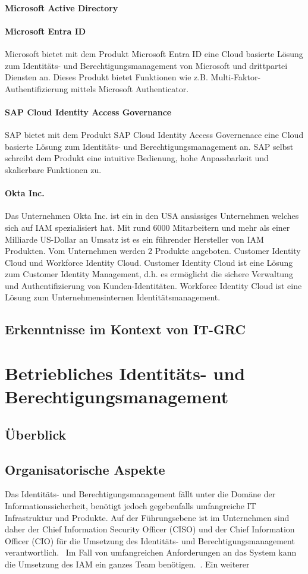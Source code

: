 \documentclass[10pt]{article}
\begin{document}
\paragraph{Microsoft Active Directory}
\paragraph{Microsoft Entra ID}
Microsoft bietet mit dem Produkt \glqq{}Microsoft Entra ID\grqq{} eine Cloud basierte Lösung zum Identitäts- und Berechtigungsmanagement von Microsoft und drittpartei Diensten an. Dieses Produkt bietet Funktionen wie z.B. Multi-Faktor-Authentifizierung mittels Microsoft Authenticator.
\paragraph{SAP Cloud Identity Access Governance}
SAP bietet mit dem Produkt \glqq{}SAP Cloud Identity Access Governenace\grqq{} eine Cloud basierte Lösung zum Identitäts- und Berechtigungsmanagement an. SAP selbst schreibt dem Produkt eine intuitive Bedienung, hohe Anpassbarkeit und skalierbare Funktionen zu.
\paragraph{Okta Inc.}
Das Unternehmen Okta Inc. ist ein in den USA ansässiges Unternehmen welches sich auf IAM spezialisiert hat. Mit rund 6000 Mitarbeitern und mehr als einer Milliarde US-Dollar an Umsatz ist es ein führender Hersteller von IAM Produkten. Vom Unternehmen werden 2 Produkte angeboten. Customer Identity Cloud und Workforce Identity Cloud. Customer Identity Cloud ist eine Lösung zum Customer Identity Management, d.h. es ermöglicht die sichere Verwaltung und Authentifizierung von Kunden-Identitäten. Workforce Identity Cloud ist eine Lösung zum Unternehmensinternen Identitätsmanagement.
\subsection{Erkenntnisse im Kontext von IT-GRC}
\section{Betriebliches Identitäts- und Berechtigungsmanagement}
\label{sec:betrieb}
\subsection{Überblick}
\subsection{Organisatorische Aspekte}
Das Identitäts- und Berechtigungsmanagement fällt unter die Domäne der Informationssicherheit, benötigt jedoch gegebenfalls umfangreiche IT Infrastruktur und Produkte. Auf der Führungsebene ist im Unternehmen sind daher der Chief Information Security Officer (CISO) und der Chief Information Officer (CIO) für die Umsetzung des Identitäts- und Berechtigungsmanagement verantwortlich.~\cite{azhar2014economics}\cite{baldwin2009using} Im Fall von umfangreichen Anforderungen an das System kann die Umsetzung des IAM ein ganzes Team benötigen.~\cite{mohammed2011identity}. Ein weiterer
\end{document}
